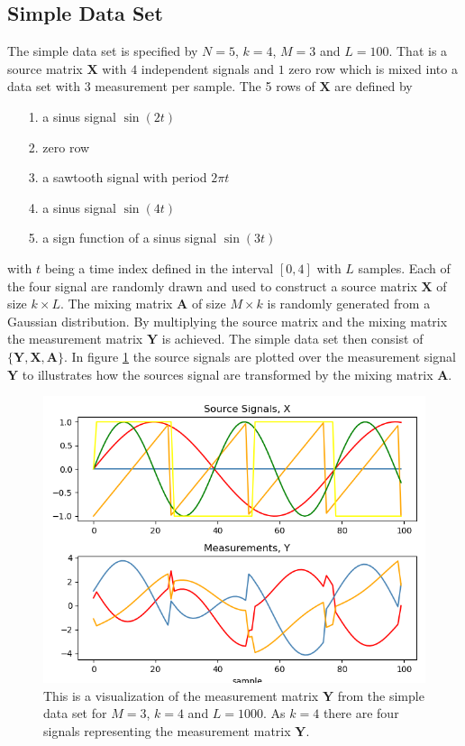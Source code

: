 \subsection{Simple Data Set}
The simple data set is specified by $N = 5$, $k=4$, $M = 3$ and $L = 100$. That is a source matrix $\textbf{X}$ with $4$ independent signals and $1$ zero row which is mixed into a data set with $3$ measurement per sample.       
The 5 rows of $\textbf{X}$ are defined by 
\begin{itemize}
\item[1.] a sinus signal $\sin(2t)$
\item[2.] zero row
\item[3.] a sawtooth signal with period $2 \pi t$
\item[4.] a sinus signal $\sin(4t)$
\item[5.] a sign function of a sinus signal $\sin(3t)$
\end{itemize}
with $t$ being a time index defined in the interval $[0,4]$ with $L$ samples. Each of the four signal are randomly drawn and used to construct a source matrix $\mathbf{X}$ of size $k \times L$.
The mixing matrix $\mathbf{A}$ of size $M \times k$ is randomly generated from a Gaussian distribution. 
By multiplying the source matrix and the mixing matrix the measurement matrix $\mathbf{Y}$ is achieved.
The simple data set then consist of $\{ \mathbf{Y}, \mathbf{X}, \mathbf{A} \}$.
In figure \ref{fig:mix} the source signals are plotted over the measurement signal $\mathbf{Y}$ to illustrates how the sources signal are transformed by the mixing matrix $\textbf{A}$.
\begin{figure}[H]
\centering
\includegraphics[scale=0.5]{figures/ch_6/simple_data.png}
\caption{This is a visualization of the measurement matrix $\mathbf{Y}$ from the simple data set for $M = 3$, $k=4$ and $L=1000$. As $k = 4$ there are four signals representing the measurement matrix $\mathbf{Y}$.}
\label{fig:mix}
\end{figure}
\noindent

